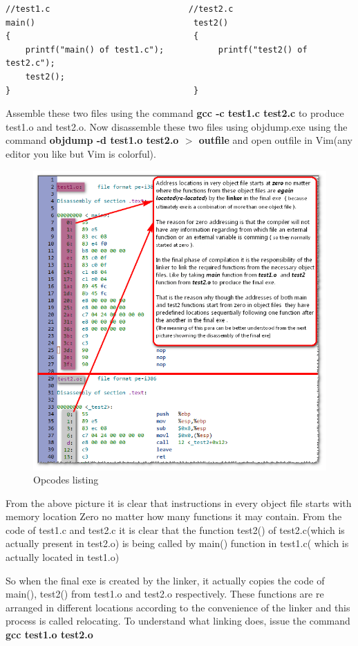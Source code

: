 \documentclass{article}
\begin{document}
\begin{verbatim}
//test1.c                            //test2.c
main()                                test2()
{                                     {
    printf("main() of test1.c");           printf("test2() of test2.c");
    test2();
}                                     }
\end{verbatim}
Assemble these two files using the command {\textbf{gcc -c test1.c test2.c}} to produce test1.o and test2.o. Now disassemble these two files using objdump.exe using the command {\textbf{objdump -d test1.o test2.o $>$ outfile}} and open outfile in Vim(any editor you like but Vim is colorful).
\begin{figure}[H]
\centering
\includegraphics[width=\textwidth]{Linking1.png}
\caption{Opcodes listing}
\end{figure}

From the above picture it is clear that instructions in every object file starts with memory location Zero no matter how many functions it may contain. From the code of test1.c and test2.c it is clear that the function test2() of test2.c(which is actually present in test2.o) is being called by main() function in test1.c( which is actually located in test1.o)

So when the final exe is created by the linker, it actually copies the code of main(), test2() from test1.o and test2.o respectively. These functions are re arranged in different locations according to the convenience of the linker and this process is called relocating. To understand what linking does, issue the command {\textbf{gcc test1.o test2.o}}
\end{document}
